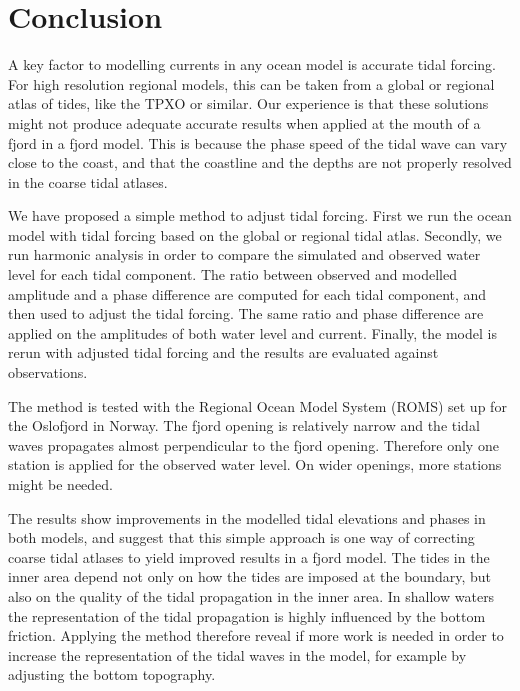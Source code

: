 \section{Conclusion}

A key factor to modelling currents in any ocean model is accurate tidal forcing. For high resolution regional models, this can be taken from a global or regional atlas of tides, like the TPXO or similar. Our experience is that these solutions might not produce adequate accurate results when applied at the mouth of a fjord in a fjord model. This is because the phase speed of the tidal wave can vary close to the coast, and that the coastline and the depths are not properly resolved in the coarse tidal atlases.

We have proposed a simple method to adjust tidal forcing. First we run the ocean model with tidal forcing based on the global or regional tidal atlas. Secondly, we run harmonic analysis in order to compare the simulated and observed water level for each tidal component. The ratio between observed and modelled amplitude and a phase difference are computed for each tidal component, and then used to adjust the tidal forcing. The same ratio and phase difference are applied on the amplitudes of both water level and current. Finally, the model is rerun with adjusted tidal forcing and the results are evaluated against observations.

The method is tested with the Regional Ocean Model System (ROMS) set up for the Oslofjord in Norway. The fjord opening is relatively narrow and the tidal waves propagates almost perpendicular to the fjord opening. Therefore only one station is applied for the observed water level. On wider openings, more stations might be needed. 
 
The results show improvements in the modelled tidal elevations and phases in both models, and suggest that this simple approach is one way of correcting coarse tidal atlases to yield improved results in a fjord model. The tides in the inner area depend not only on how the tides are imposed at the boundary, but also on the quality of the tidal propagation in the inner area. In shallow waters the representation of the tidal propagation is highly influenced by the bottom friction. Applying the method therefore reveal if more work is needed in order to increase the representation of the tidal waves in the model, for example by adjusting the bottom topography.
